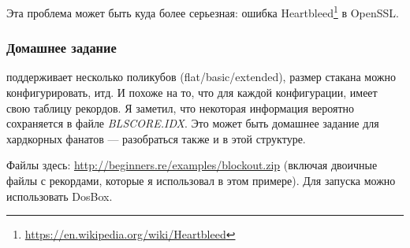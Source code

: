 Эта проблема может быть куда более серьезная: ошибка Heartbleed\footnote{\url{https://en.wikipedia.org/wiki/Heartbleed}}
в OpenSSL.

\subsubsection{Домашнее задание}

 поддерживает несколько поликубов (flat/basic/extended), размер стакана можно конфигурировать, итд.
И похоже на то, что для каждой конфигурации,  имеет свою таблицу рекордов.
Я заметил, что некоторая информация вероятно сохраняется в файле \emph{BLSCORE.IDX}.
Это может быть домашнее задание для хардкорных фанатов  --- разобраться также и в этой структуре.

Файлы  здесь: \url{http://beginners.re/examples/blockout.zip}
(включая двоичные файлы с рекордами, которые я использовал в этом примере).
Для запуска можно использовать DosBox.

